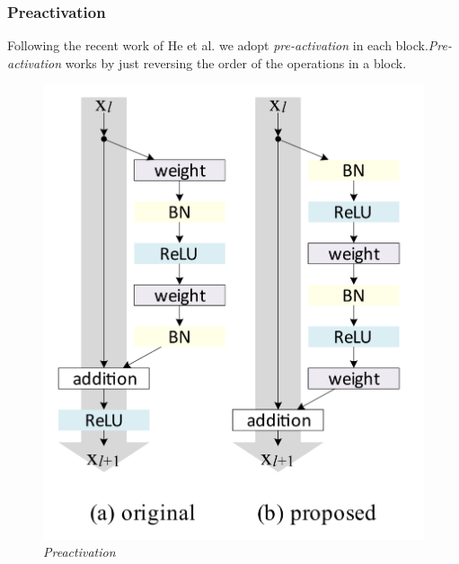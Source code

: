 \documentclass[../document.tex]{subfiles}
\begin{document}
\subsubsection{Preactivation}
Following the recent work of He et al. \cite{he2015identity} we adopt \emph{pre-activation} in each block.\emph{Pre-activation} works by just reversing the order of the operations in a block.

\begin{figure}[H]
    \centering
    \includegraphics[scale=0.2]{../img/implementation/estimator/preactivation.png}
    \caption{\emph{Preactivation} \cite{he2015identity}}
\end{figure}
\end{document}
